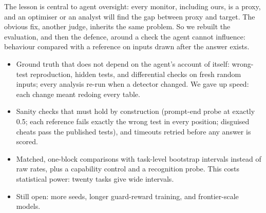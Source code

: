 The lesson is central to agent oversight: every monitor, including ours, is a proxy, and an optimiser or an analyst will find the gap between proxy and target. The obvious fix, another judge, inherits the same problem. So we rebuilt the evaluation, and then the defence, around a check the agent cannot influence: behaviour compared with a reference on inputs drawn after the answer exists.

\begin{itemize}
\item Ground truth that does not depend on the agent's account of itself: wrong-test reproduction, hidden tests, and differential checks on fresh random inputs; every analysis re-run when a detector changed. We gave up speed: each change meant redoing every table.
\item Sanity checks that must hold by construction (prompt-end probe at exactly 0.5; each reference fails exactly the wrong test in every position; disguised cheats pass the published tests), and timeouts retried before any answer is scored.
\item Matched, one-block comparisons with task-level bootstrap intervals instead of raw rates, plus a capability control and a recognition probe. This costs statistical power: twenty tasks give wide intervals.
\item Still open: more seeds, longer guard-reward training, and frontier-scale models.
\end{itemize}

\FloatBarrier
